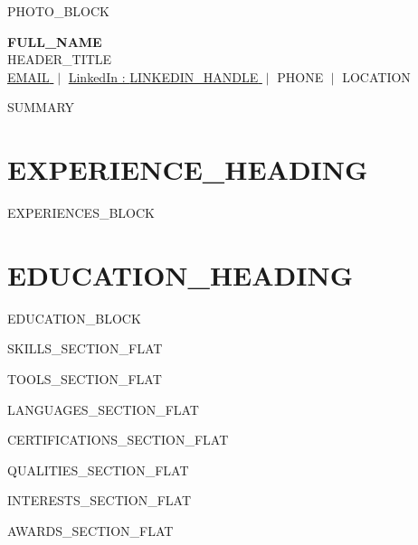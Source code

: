 \documentclass[10.5pt,a4paper]{article}
\begin{document}
\color{text}

{{PHOTO_BLOCK}}

\begin{center}
{\color{accent}\sffamily\Huge\bfseries {{FULL_NAME}} }\\[2pt]
{\color{accent}\sffamily\Large {{HEADER_TITLE}} }\\[6pt]
{\small \href{mailto:{{EMAIL}}}{ {{EMAIL}} } $\;|\;$
\href{ {{LINKEDIN_URL}} }{LinkedIn : {{LINKEDIN_HANDLE}} } $\;|\;$
{{PHONE}} $\;|\;$ {{LOCATION}} }
\end{center}

\vspace{0.2em}

{{SUMMARY}}

\section*{ {{EXPERIENCE_HEADING}} }

{{EXPERIENCES_BLOCK}}

\section*{ {{EDUCATION_HEADING}} }

{{EDUCATION_BLOCK}}

{{SKILLS_SECTION_FLAT}}

{{TOOLS_SECTION_FLAT}}

{{LANGUAGES_SECTION_FLAT}}

{{CERTIFICATIONS_SECTION_FLAT}}

{{QUALITIES_SECTION_FLAT}}

{{INTERESTS_SECTION_FLAT}}

{{AWARDS_SECTION_FLAT}}
\end{document}
